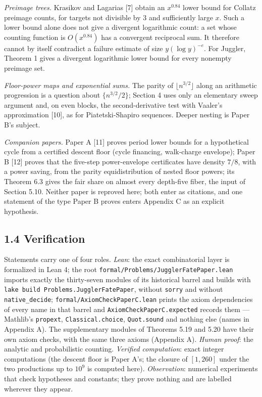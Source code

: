 \documentclass[11pt,a4paper]{article}
\begin{document}
\emph{Preimage trees.} Krasikov and Lagarias {[}7{]} obtain an
\(x^{0.84}\) lower bound for Collatz preimage counts, for targets not
divisible by \(3\) and sufficiently large \(x\). Such a lower bound
alone does not give a divergent logarithmic count: a set whose counting
function is \(O(x^{0.84})\) has a convergent reciprocal sum. It
therefore cannot by itself contradict a failure estimate of size
\(y(\log y)^{-e}\). For Juggler, Theorem 1 gives a divergent logarithmic
lower bound for every nonempty preimage set.

\emph{Floor-power maps and exponential sums.} The parity of
\(\lfloor n^{3/2}\rfloor\) along an arithmetic progression is a question
about \(\{n^{3/2}/2\}\); Section 4 uses only an elementary sweep
argument and, on even blocks, the second-derivative test with Vaaler's
approximation {[}10{]}, as for Piatetski-Shapiro sequences. Deeper
nesting is Paper B's subject.

\emph{Companion papers.} Paper A {[}11{]} proves period lower bounds for
a hypothetical cycle from a certified descent floor (cycle financing,
walk-charge envelope); Paper B {[}12{]} proves that the five-step
power-envelope certificates have density \(7/8\), with a power saving,
from the parity equidistribution of nested floor powers; its Theorem 6.3
gives the fair share on almost every depth-five fiber, the input of
Section 5.10. Neither paper is reproved here; both enter as citations,
and one statement of the type Paper B proves enters Appendix C as an
explicit hypothesis.

\subsection{1.4 Verification}\label{verification}

Statements carry one of four roles. \emph{Lean}: the exact combinatorial
layer is formalized in Lean 4; the root
\texttt{\nolinkurl{formal/Problems/JugglerFatePaper.lean}} imports
exactly the thirty-seven modules of its historical barrel and builds
with \texttt{lake\ build\ Problems.JugglerFatePaper}, without
\texttt{\nolinkurl{sorry}} and without
\texttt{\nolinkurl{native_decide}};
\texttt{\nolinkurl{formal/AxiomCheckPaperC.lean}} prints the axiom
dependencies of every name in that barrel and
\texttt{\nolinkurl{AxiomCheckPaperC.expected}} records them ---
Mathlib's \texttt{\nolinkurl{propext}},
\texttt{\nolinkurl{Classical.choice}}, \texttt{\nolinkurl{Quot.sound}}
and nothing else (names in Appendix A). The supplementary modules of
Theorems 5.19 and 5.20 have their own axiom checks, with the same three
axioms (Appendix A). \emph{Human proof}: the analytic and probabilistic
counting. \emph{Verified computation}: exact integer computations (the
descent floor is Paper A's; the closure of \([1,260]\) under the two
productions up to \(10^9\) is computed here). \emph{Observation}:
numerical experiments that check hypotheses and constants; they prove
nothing and are labelled wherever they appear.
\end{document}
